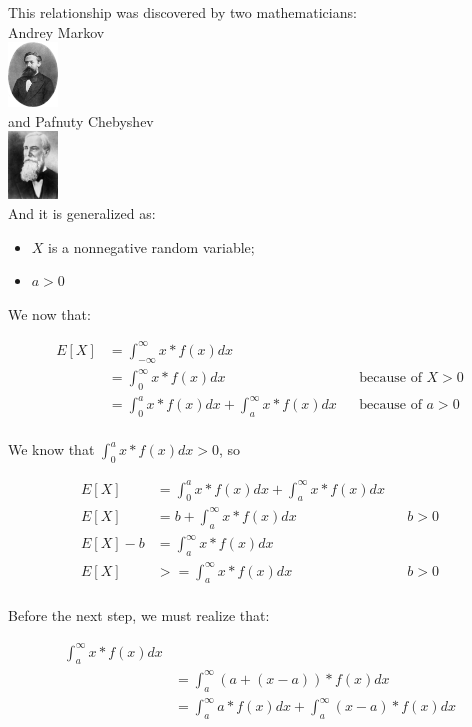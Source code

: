 \documentclass[10pt,a4paper]{book}
\begin{document}
This relationship was discovered by two mathematicians:\\	
Andrey Markov\\
\includegraphics[width=50px]{AAMarkov}\\

and Pafnuty Chebyshev\\
\includegraphics[width=50px]{Chebyshev}\\

And it is generalized as:
\begin{itemize}
	\item {$X$ is a nonnegative random variable;}
	\item {$a > 0$}
\end{itemize}	

We now that:

\begin{align*}
	E[X] &= \int_{-\infty}^{\infty}{x*f(x)dx}\\
	&= \int_{0}^{\infty}{x*f(x)dx} && \text{because of } X > 0\\
	&= \int_{0}^{a}{x*f(x)dx} + \int_{a}^{\infty}{x*f(x)dx} && \text{because of } a > 0\\	
\end{align*}

We know that $\int_{0}^{a}{x*f(x)dx} > 0$, so

\begin{align*}
	E[X] &= \int_{0}^{a}{x*f(x)dx} + \int_{a}^{\infty}{x*f(x)dx}\\
	E[X] &= b + \int_{a}^{\infty}{x*f(x)dx} && b > 0\\
	E[X] - b &= \int_{a}^{\infty}{x*f(x)dx}\\
	E[X] &>= \int_{a}^{\infty}{x*f(x)dx} && b > 0\\
\end{align*}

Before the next step, we must realize that:

\begin{align*}
	\int_{a}^{\infty}{x*f(x)dx}&\\
	&=\int_{a}^{\infty}{(a+(x-a))*f(x)dx}\\
	&=\int_{a}^{\infty}{a*f(x)dx}+\int_{a}^{\infty}{(x-a)*f(x)dx}\\
\end{align*}
\end{document}
